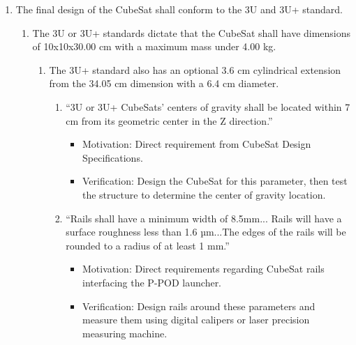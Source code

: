 \noindent
\begin{enumerate} %
    \item The final design of the CubeSat shall conform to the 3U and 3U+ standard.
    \begin{enumerate}
        \item The 3U or 3U+ standards dictate that the CubeSat shall have dimensions of 10x10x30.00 cm with a maximum mass under 4.00 kg.
        \begin{enumerate}
            \item The 3U+ standard also has an optional 3.6 cm cylindrical extension from the 34.05 cm dimension with a 6.4 cm diameter.  
            \begin{enumerate}
                \item “3U or 3U+ CubeSats’ centers of gravity shall be located within 7 cm from its geometric center in the Z direction.” \cite{CSS} 
                \begin{itemize}
                    \item Motivation: Direct requirement from CubeSat Design Specifications. 
                    \item Verification: Design the CubeSat for this parameter, then test the structure to determine the center of gravity location. 
                \end{itemize}
                \item “Rails shall have a minimum width of 8.5mm... Rails will have a surface roughness less than 1.6 µm...The edges of the rails will be rounded to a radius of at least 1 mm.” \cite{CSS} 
                \begin{itemize}
                    \item Motivation: Direct requirements regarding CubeSat rails interfacing the P-POD launcher.  
                    \item Verification: Design rails around these parameters and measure them using digital calipers or laser precision measuring machine.
                \end{itemize}
            \end{enumerate}
        \end{enumerate}


\end{enumerate}
\end{enumerate}
